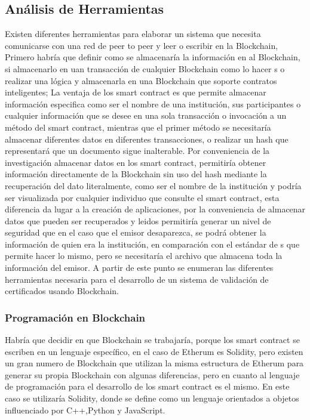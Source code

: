 \subsection{ Análisis de Herramientas}
Existen diferentes herramientas para elaborar un sistema que necesita comunicarse con una red de peer to peer y leer o escribir en la Blockchain,
Primero habría que definir como se almacenaría la información en al Blockchain, si almacenarlo en uan transacción de cualquier  Blockchain como lo hacer
s o realizar una lógica y almacenarla en una  Blockchain que soporte contratos inteligentes;
La ventaja de los smart contract es que permite almacenar información especifica como ser el nombre de una institución, sus participantes o
cualquier información que se desee en una sola transacción o invocación a un método del smart contract, mientras que el primer método se necesitaría 
almacenar diferentes datos en diferentes transacciones, o realizar un hash que representará que un documento sigue inalterable.
Por conveniencia de la investigación almacenar datos en los smart contract, permitiría obtener información directamente de 
la  Blockchain sin uso del hash mediante la recuperación del dato literalmente, como ser el nombre de la institución y podría ser visualizada por cualquier 
individuo que consulte el smart contract, esta diferencia da lugar a la creación de aplicaciones, por la 
conveniencia de almacenar datos que pueden ser recuperados y leidos permitiría generar un nivel de seguridad que en el caso que el  emisor
desaparezca, se podrá obtener la información de quien era la institución, en comparación
con el estándar de s que permite hacer lo mismo, pero se necesitaría el archivo que almacena toda la información del emisor.\cite[]{blockcerts_introduction_nodate,opencerts_gestion_nodate}
A partir de este punto se enumeran las diferentes herramientas necesaria para el desarrollo de un sistema de validación de certificados usando Blockchain.

\subsubsection{Programación en Blockchain}

Habría que decidir en que  Blockchain se trabajaría, porque los smart contract se escriben en un lenguaje específico,
en el caso de Etherum es Solidity, pero existen un gran numero de  Blockchain que utilizan la misma estructura de Etherum para generar 
su propia  Blockchain con algunas diferencias, pero en cuanto al lenguaje de programación  para el desarrollo de los smart contract 
es el mismo. En este caso se utilizaría Solidity, donde se define como un lenguaje orientados a objetos influenciado  por
C++,Python y JavaScript. \cite[]{dannen_introducing_2017,ethereum_solidity_nodate}

